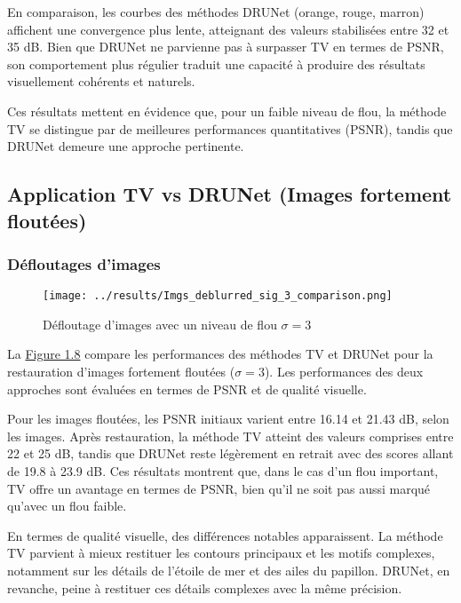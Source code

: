\documentclass[a4paper, 12pt]{report} %
\begin{document}
En comparaison, les courbes des méthodes DRUNet (orange, rouge, marron) affichent une convergence plus lente, atteignant des valeurs stabilisées entre 32 et 35 dB. Bien que DRUNet ne parvienne pas à surpasser TV en termes de PSNR, son comportement plus régulier traduit une capacité à produire des résultats visuellement cohérents et naturels.

Ces résultats mettent en évidence que, pour un faible niveau de flou, la méthode TV se distingue par de meilleures performances quantitatives (PSNR), tandis que DRUNet demeure une approche pertinente.


\subsection{Application TV vs DRUNet (Images fortement floutées)}

\subsubsection{Défloutages d'images}

\begin{figure}[H]
\centering
\begin{adjustbox}{width=0.985\linewidth, totalheight=0.47 \textheight, angle=0, scale= 0.9, minipage= 4.2\linewidth, margin= 0}
    \texttt{[image: ../results/Imgs\_deblurred\_sig\_3\_comparison.png]}
\end{adjustbox}
    \caption{Défloutage d'images avec un niveau de flou $\sigma = 3$}
    \label{fig:8}
\end{figure} 

La \hyperref[fig:8]{Figure 1.8} compare les performances des méthodes TV et DRUNet pour la restauration d’images fortement floutées (\(\sigma = 3\)). Les performances des deux approches sont évaluées en termes de PSNR et de qualité visuelle.

Pour les images floutées, les PSNR initiaux varient entre 16.14 et 21.43 dB, selon les images. Après restauration, la méthode TV atteint des valeurs comprises entre 22 et 25 dB, tandis que DRUNet reste légèrement en retrait avec des scores allant de 19.8 à 23.9 dB. Ces résultats montrent que, dans le cas d’un flou important, TV offre un avantage en termes de PSNR, bien qu’il ne soit pas aussi marqué qu’avec un flou faible.

En termes de qualité visuelle, des différences notables apparaissent. La méthode TV parvient à mieux restituer les contours principaux et les motifs complexes, notamment sur les détails de l’étoile de mer et des ailes du papillon. DRUNet, en revanche, peine à restituer ces détails complexes avec la même précision.
\end{document}
